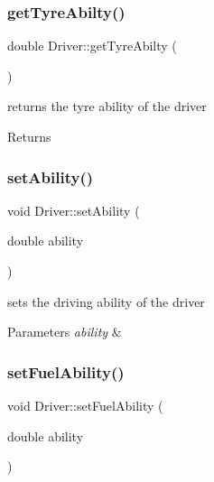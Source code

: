 \subsubsection{\texorpdfstring{get\+Tyre\+Abilty()}{getTyreAbilty()}}
{\footnotesize\ttfamily double Driver\+::get\+Tyre\+Abilty (\begin{DoxyParamCaption}{ }\end{DoxyParamCaption})\hspace{0.3cm}{\ttfamily [inline]}}

returns the tyre ability of the driver \begin{DoxyReturn}{Returns}

\end{DoxyReturn}
\mbox{\label{class_driver_a4a9f32db577248f084d1da01d1fab07a}} 
\subsubsection{\texorpdfstring{set\+Ability()}{setAbility()}}
{\footnotesize\ttfamily void Driver\+::set\+Ability (\begin{DoxyParamCaption}\item[{double}]{ability }\end{DoxyParamCaption})\hspace{0.3cm}{\ttfamily [inline]}}

sets the driving ability of the driver 
\begin{DoxyParams}{Parameters}
{\em ability} & \\
\hline
\end{DoxyParams}
\mbox{\label{class_driver_aeec270d3160736095047e78018378864}} 
\subsubsection{\texorpdfstring{set\+Fuel\+Ability()}{setFuelAbility()}}
{\footnotesize\ttfamily void Driver\+::set\+Fuel\+Ability (\begin{DoxyParamCaption}\item[{double}]{ability }\end{DoxyParamCaption})\hspace{0.3cm}{\ttfamily [inline]}}

